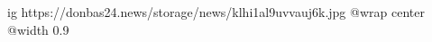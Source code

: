  
 
 
 
 

\ifcmt
  ig https://donbas24.news/storage/news/klhi1al9uvvauj6k.jpg
  @wrap center
  @width 0.9
\fi
